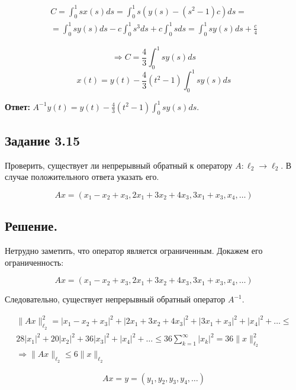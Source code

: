 \documentclass[a4paper, 12pt]{report}
\begin{document}
\begin{multline*}
C = \int_{0}^{1} s x(s) ds = \int_{0}^{1} s (y(s) - (s^2 - 1)c)ds =\\=
\int_{0}^{1} s y(s) ds - c \int_{0}^{1} s^3 ds + c \int_{0}^{1 }s ds =
\int_{0}^{1} s y(s) ds + \frac{c}{4}
\end{multline*}

\[\Rightarrow C = \frac{4}{3} \int_{0}^{1} s y(s) ds\]
\[x(t) = y(t) - \frac{4}{3}(t^2 - 1) \int_{0}^{1} s y(s) ds\]

\textbf{Ответ:} $A^{-1} y(t) = y(t) - \frac{4}{3}(t^2 - 1) \int_{0}^{1} s y(s) ds$.

\subsection*{Задание 3.15}

Проверить, существует ли непрерывный обратный к оператору $A: \ell_2 \to \ell_2$.
В случае положительного ответа указать его.

\[ Ax = (x_1 - x_2 + x_3, 2x_1 + 3x_2 + 4x_3, 3x_1 + x_3, x_4, \dots ) \]

\subsection*{Решение.}

Нетрудно заметить, что оператор является ограниченным. Докажем его ограниченность:

\[ Ax = (x_1 - x_2 + x_3, 2x_1 + 3x_2 + 4x_3, 3x_1 + x_3, x_4, \dots ) \]

Следовательно, существует непрерывный обратный оператор $A^{-1}$.

\begin{multline*}
    \| A x \|_{\ell_2}^2 = |x_1 - x_2 + x_3 |^2 + |2 x_1 + 3 x_2 + 4 x_3 |^2 +
    | 3 x_1 + x_3 |^2 + | x_4 |^2 + \dots \le\\
    28 |x_1|^2 + 20 |x_2|^2 + 36 |x_3|^2 + |x_4|^2 + \dots \le
    36 \sum_{k = 1}^{\infty} |x_k|^2 = 36 \| x \|_{\ell_2}^2 \\
    \Rightarrow \| Ax \|_{\ell_2} \le 6 \| x \|_{\ell_2}
\end{multline*}

\[Ax = y = (y_1, y_2, y_3, y_4, \dots )\]
\end{document}
